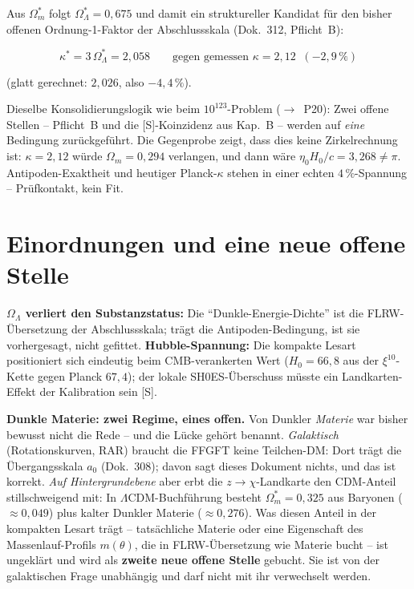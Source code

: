 Aus $\Omega_m^{*}$ folgt $\Omega_\Lambda^{*} = 0{,}675$ und damit
ein struktureller Kandidat für den bisher offenen
Ordnung-1-Faktor der Abschlussskala (Dok.~312, Pflicht~B):

\begin{equation}
  \kappa^{*} = 3\,\Omega_\Lambda^{*} = 2{,}058
  \qquad\text{gegen gemessen } \kappa = 2{,}12
  \;\;(-2{,}9\,\%)
\end{equation}

\noindent (glatt gerechnet: $2{,}026$, also $-4{,}4\,\%$).

Dieselbe Konsolidierungslogik wie beim $10^{123}$-Problem
($\to$~P20): Zwei offene Stellen -- Pflicht~B und die
[S]-Koinzidenz aus Kap.~B -- werden auf \emph{eine} Bedingung
zurückgeführt. Die Gegenprobe zeigt, dass dies keine
Zirkelrechnung ist: $\kappa = 2{,}12$ würde $\Omega_m = 0{,}294$
verlangen, und dann wäre $\eta_0 H_0/c = 3{,}268 \ne \pi$.
Antipoden-Exaktheit und heutiger Planck-$\kappa$ stehen in einer
echten $4\,\%$-Spannung -- Prüfkontakt, kein Fit.

\section{Einordnungen und eine neue offene Stelle}

\textbf{$\Omega_\Lambda$ verliert den Substanzstatus:} Die
\enquote{Dunkle-Energie-Dichte} ist die FLRW-Übersetzung der
Abschlussskala; trägt die Antipoden-Bedingung, ist sie
vorhergesagt, nicht gefittet. \textbf{Hubble-Spannung:} Die
kompakte Lesart positioniert sich eindeutig beim CMB-verankerten
Wert ($H_0 = 66{,}8$ aus der $\xi^{10}$-Kette gegen Planck
$67{,}4$); der lokale SH0ES-Überschuss müsste ein
Landkarten-Effekt der Kalibration sein [S].

\textbf{Dunkle Materie: zwei Regime, eines offen.} Von Dunkler
\emph{Materie} war bisher bewusst nicht die Rede -- und die Lücke
gehört benannt. \emph{Galaktisch} (Rotationskurven, RAR) braucht
die FFGFT keine Teilchen-DM: Dort trägt die Übergangsskala $a_0$
(Dok.~308); davon sagt dieses Dokument nichts, und das ist
korrekt. \emph{Auf Hintergrundebene} aber erbt die
$z\to\chi$-Landkarte den CDM-Anteil stillschweigend mit: In
$\Lambda$CDM-Buchführung besteht $\Omega_m^{*} = 0{,}325$ aus
Baryonen ($\approx 0{,}049$) plus kalter Dunkler Materie
($\approx 0{,}276$). Was diesen Anteil in der kompakten Lesart
trägt -- tatsächliche Materie oder eine Eigenschaft des
Massenlauf-Profils $m(\theta)$, die in FLRW-Übersetzung wie
Materie bucht -- ist ungeklärt und wird als \textbf{zweite neue
offene Stelle} gebucht. Sie ist von der galaktischen Frage
unabhängig und darf nicht mit ihr verwechselt werden.


